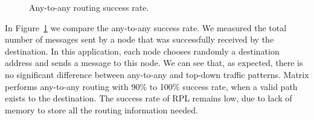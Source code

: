 \begin{figure}[t]
    \centering
    
    \caption{Any-to-any routing success rate.}
    \label{fig:txany}
\end{figure}

In Figure~\ref{fig:txany} we compare the any-to-any success rate. We measured the total number of messages sent by a node that was successfully received by the destination. In this application, each node chooses randomly a destination address and sends a message to this node. We can see that, as expected, there is no significant difference between any-to-any and top-down traffic patterns. Matrix performs any-to-any routing with 90\% to 100\% success rate, when a valid path exists to the destination. The success rate of RPL remains low, due to lack of memory to store all the routing information needed. 

